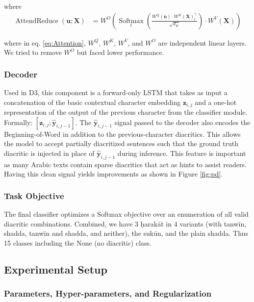 \documentclass[11pt]{article}
\begin{document}
where
\begin{align}
    \label{eq:Attention}
    \operatorname{AttendReduce}\left(\mathbf{u}; \mathbf{X}\right)
        &= W^O \left(
            \operatorname*{Softmax}_t \left(
            \frac
            {
                W^Q(\mathbf{u})
                \cdot
                W^K(\mathbf{X})_t
                ^\top
            }
            {\sqrt{d_K}}
        \right)
            \cdot
            W^V\!\left(\mathbf{X}\right)
        \right)
\end{align}

 where in eq. \eqref{eq:Attention}, $W^Q$, $W^K$, $W^V$, and $W^O$ are independent linear layers. We tried to remove $W^O$ but faced lower performance.


\subsubsection{Decoder}
Used in D3, this component is a forward-only LSTM that takes as input a concatenation of the basic contextual character embedding $\textbf{z}_{i,j}$ and a one-hot representation of the output of the previous character from the classifier module. Formally: $[\textbf{z}_{i,j} ; \hat{\textbf{y}}_{i, j-1}]$. The $\hat{\mathbf{y}}_{i, j-1}$ signal passed to the decoder also encodes the Beginning-of-Word in addition to the previous-character diacritics. This allows the model to accept partially diacritized sentences such that the ground truth diacritic is injected in place of $\hat{\textbf{y}}_{i, j-1}$ during inference. This feature is important as many Arabic texts contain sparse diacritics that act as hints to assist readers. Having this clean signal yields improvements as shown in Figure \ref{fig:pd}.

\subsubsection{Task Objective}
The final classifier optimizes a Softmax objective over an enumeration of all valid diacritic combinations. Combined, we have 3 \d{h}arakāt in 4 variants (with tanwīn, shadda, tanwīn and shadda, and neither), the sukūn, and the plain shadda. Thus 15 classes including the None (no diacritic) class.

\subsection{Experimental Setup}

\subsubsection{Parameters, Hyper-parameters, and Regularization}
\end{document}
